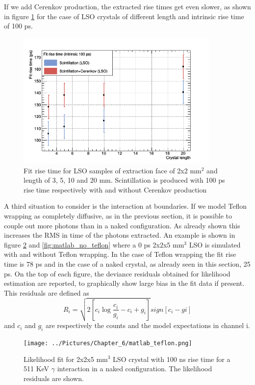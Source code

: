 If we add Cerenkov production, the extracted rise times get even slower, as shown in figure \ref{fig:rise_cer} for the case of LSO crystals of different length and intrinsic rise time of 100 ps.
\begin{figure}[htbp]
\begin{center}
\includegraphics[width=10cm]{../Pictures/Chapter_6/rise_with_cer.png}
\end{center}
\caption[Extracted rise time for scintillation and Cerenkov production]{Fit rise time for LSO samples of extraction face of 2x2 mm$^{2}$ and length of 3, 5, 10 and 20 mm. Scintillation is produced with 100 ps rise time respectively with and without Cerenkov production}
\label{fig:rise_cer}
\end{figure}
A third situation to consider is the interaction at boundaries. If we model Teflon wrapping as completely diffusive, as in the previous section, it is possible to couple out more photons than in a naked configuration. As already shown this increases the RMS in time of the photons extracted. An example is shown in figure \ref{fig:matlab_teflon} and \ref{fig:matlab_no_teflon} where a 0 ps 2x2x5 mm$^{3}$ LSO is simulated with and without Teflon wrapping. In the case of Teflon wrapping the fit rise time is 78 ps and in the case of a naked crystal, as already seen in this section, 25 ps. On the top of each figure, the deviance residuals obtained for likelihood estimation are reported, to graphically show large bias in the fit data if present. This residuals are defined as
\begin{equation}
R_{i} = \sqrt{2\left[ c_{i}\log{\frac{c_{i}}{g_{i}}-c_{i}+g_{i}} \right]}sign\left[ c_{i}-g{i} \right]
\end{equation}
and $c_{i}$ and $g_{i}$ are respectively the counts and the model expectations in channel i.

\begin{figure}[htbp]
\begin{center}
\texttt{[image: ../Pictures/Chapter\_6/matlab\_teflon.png]}
\end{center}
\caption[Likelihood fit for LSO naked]{Likelihood fit for 2x2x5 mm$^{3}$ LSO crystal with 100 ns rise time for a 511 KeV $\gamma$ interaction in a naked configuration. The likelihood residuals are shown.}
\label{fig:matlab_teflon}
\end{figure}

